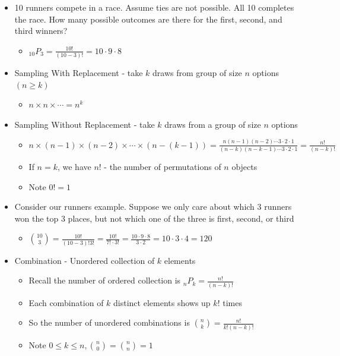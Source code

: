 \documentclass{article}
\begin{document}
\begin{itemize}
    \item 10 runners compete in a race. Assume ties are not possible. All 10 completes the race. How many possible outcomes are there for the first, second, and third winners?
    \begin{itemize}
        \item ${}_{10}P_3 = \frac{10!}{(10-3)!} = 10 \cdot 9 \cdot 8$
    \end{itemize}
    \item Sampling With Replacement - take $k$ draws from group of size $n$ options $(n \ge k)$
    \begin{itemize}
        \item $n \times n \times \cdots = n^k$
    \end{itemize}
    \item Sampling Without Replacement - take $k$ draws from a group of size $n$ options
    \begin{itemize}
        \item $n \times (n-1) \times (n-2) \times \cdots \times (n - (k-1)) = \frac{n(n-1)(n-2) \cdots 3 \cdot 2 \cdot 1}{(n-k)(n-k-1) \cdots 3 \cdot 2 \cdot 1} = \frac{n!}{(n-k)!}$
        \item If $n=k$, we have $n!$ - the number of permutations of $n$ objects
        \item Note $0! = 1$
    \end{itemize}
    \item Consider our runners example. Suppose we only care about which 3 runners won the top 3 places, but not which one of the three is first, second, or third
    \begin{itemize}
        \item $\binom{10}{3} = \frac{10!}{(10-3)!3!} = \frac{10!}{7! \cdot 3!} = \frac{10 \cdot 9 \cdot 8}{3 \cdot 2} = 10 \cdot 3 \cdot 4 = 120$
    \end{itemize}
    \item Combination - Unordered collection of $k$ elements
    \begin{itemize}
        \item Recall the number of ordered collection is $_nP_k = \frac{n!}{(n-k)!}$
        \item Each combination of $k$ distinct elements shows up $k!$ times
        \item So the number of unordered combinations is $\binom{n}{k} = \frac{n!}{k!(n-k)!}$
        \item Note $0 \le k \le n, \binom{n}{0} = \binom{n}{n}=1$
    \end{itemize}
\end{itemize}
\end{document}
